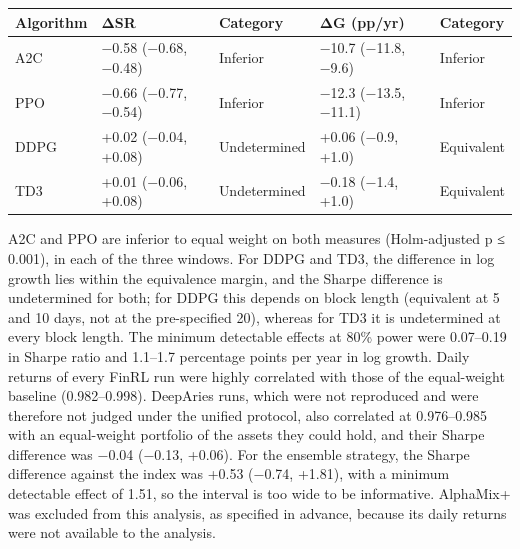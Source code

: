 \documentclass[12pt,a4paper]{report}
\begin{document}
{\small
\begin{longtable}[]{@{}
  >{\raggedright\arraybackslash}p{}
  >{\raggedright\arraybackslash}p{}
  >{\raggedright\arraybackslash}p{}
  >{\raggedright\arraybackslash}p{}
  >{\raggedright\arraybackslash}p{}@{}}
\toprule\noalign{}
\begin{minipage}[b]{\linewidth}\raggedright
Algorithm
\end{minipage} & \begin{minipage}[b]{\linewidth}\raggedright
ΔSR
\end{minipage} & \begin{minipage}[b]{\linewidth}\raggedright
Category
\end{minipage} & \begin{minipage}[b]{\linewidth}\raggedright
ΔG (pp/yr)
\end{minipage} & \begin{minipage}[b]{\linewidth}\raggedright
Category
\end{minipage} \\
\midrule\noalign{}
\endhead
\bottomrule\noalign{}
\endlastfoot
A2C & −0.58 (−0.68, −0.48) & Inferior & −10.7 (−11.8, −9.6) &
Inferior \\
PPO & −0.66 (−0.77, −0.54) & Inferior & −12.3 (−13.5, −11.1) &
Inferior \\
DDPG & +0.02 (−0.04, +0.08) & Undetermined & +0.06 (−0.9, +1.0) &
Equivalent \\
TD3 & +0.01 (−0.06, +0.08) & Undetermined & −0.18 (−1.4, +1.0) &
Equivalent \\
\end{longtable}
}

A2C and PPO are inferior to equal weight on both measures (Holm-adjusted
p ≤ 0.001), in each of the three windows. For DDPG and TD3, the
difference in log growth lies within the equivalence margin, and the
Sharpe difference is undetermined for both; for DDPG this depends on
block length (equivalent at 5 and 10 days, not at the pre-specified 20),
whereas for TD3 it is undetermined at every block length. The minimum
detectable effects at 80\% power were 0.07--0.19 in Sharpe ratio and
1.1--1.7 percentage points per year in log growth. Daily returns of
every FinRL run were highly correlated with those of the equal-weight
baseline (0.982--0.998). DeepAries runs, which were not reproduced and
were therefore not judged under the unified protocol, also correlated at
0.976--0.985 with an equal-weight portfolio of the assets they could
hold, and their Sharpe difference was −0.04 (−0.13, +0.06). For the
ensemble strategy, the Sharpe difference against the index was +0.53
(−0.74, +1.81), with a minimum detectable effect of 1.51, so the
interval is too wide to be informative. AlphaMix+ was excluded from this
analysis, as specified in advance, because its daily returns were not
available to the analysis.
\end{document}
